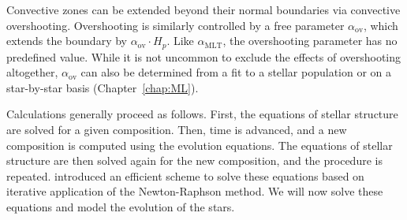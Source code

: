 \begin{description}
    Convective zones can be extended beyond their normal boundaries via convective overshooting. 
    Overshooting is similarly controlled by a free parameter $\alpha_{\text{ov}}$, which extends the boundary by ${\alpha_{\text{ov}} \cdot H_p}$. 
    Like $\alpha_{\text{MLT}}$, the overshooting parameter has no predefined value. 
    While it is not uncommon to exclude the effects of overshooting altogether, $\alpha_{\text{ov}}$ can also be determined from a fit to a stellar population \citep[e.g.,][]{2005ARA&A..43..387G} or on a star-by-star basis (Chapter~\ref{chap:ML}). 

\end{description}

\noindent Calculations generally proceed as follows. 
First, the equations of stellar structure are solved for a given composition. 
Then, time is advanced, and a new composition is computed using the evolution equations. 
The equations of stellar structure are then solved again for the new composition, and the procedure is repeated. 
\citet{1959ApJ...129..628H} introduced an efficient scheme to solve these equations based on iterative application of the Newton-Raphson method. 
We will now solve these equations and model the evolution of the stars. %


